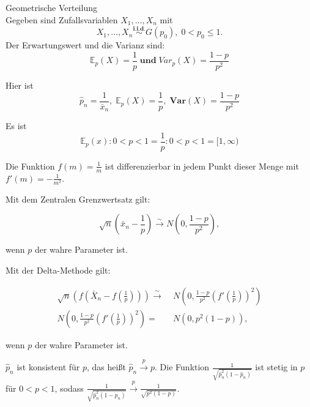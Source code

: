 \documentclass[10pt]{article}
\newcommand{\FZV}{X_1, \ldots, X_n} %
\newcommand{\EW}{\mathbb{E}} %
\newcommand{\KW}{\overset{p} \longrightarrow} %
\newcommand{\KV}{\overset{\sim} \longrightarrow} %
\newenvironment{BSP}[1][]
{\begin{Beispiel}[frametitle=#1]}{\end{Beispiel}}
\begin{document}
	\begin{BSP}[Beispiel 1..... (Delta-Methode)]		
		\noindent Geometrische Verteilung \\
		Gegeben sind Zufallsvariablen $\FZV$ mit
		\begin{equation*}
			\FZV \overset{\textbf{i.i.d.}}{\sim} G(p_0), \; 0 < p_0 \leq 1.
		\end{equation*} 
		Der Erwartungswert und die Varianz sind:
		\begin{equation*}
			\EW_p(X) = \frac{1}{p} \; \textbf{und} \; Var_p(X) = \frac{1-p}{p^2}
		\end{equation*}
		
		\noindent Hier ist
		\begin{equation*}
			\hat{p}_n = \frac{1}{\bar{x}_n}, \; \EW_p(X) = \frac{1}{p},\; \textbf{Var}(X) = \frac{1-p}{p^2} 
		\end{equation*}
		
		\noindent Es ist
		\begin{equation*}
			{\EW_p(x) : 0<p<1} = {\frac{1}{p}: 0<p<1} = [1, \infty)
		\end{equation*}
		
		\noindent Die Funktion $f(m)= \frac{1}{m}$ ist differenzierbar in jedem Punkt dieser Menge mit $f'(m)= - \frac{1}{m^2}$. 
		
		\noindent Mit dem Zentralen Grenzwertsatz gilt:
		
		\begin{equation*}
			\sqrt{n}\left(\bar{x}_n - \frac{1}{p}\right) \KV N\left(0, \frac{1-p}{p^2}\right),
		\end{equation*}
		
		\noindent wenn $p$ der wahre Parameter ist. 
		
		\noindent Mit der Delta-Methode gilt:
		
		\begin{equation*}
			\begin{split}
				\sqrt{n} \left(f\left(\bar{X}_n-f\left(\frac{1}{p}\right)\right)\right) \KV&\; N\left(0,\frac{1-p}{p^2}\left(f'\left(\frac{1}{p}\right)\right)^2\right) \\
				N\left(0,\frac{1-p}{p^2}\left(f'\left(\frac{1}{p}\right)\right)^2\right) = &\;N(0,p^2(1-p)),
			\end{split}
		\end{equation*}
		
		\noindent wenn $p$ der wahre Parameter ist.
		
		$\hat{p}_n$ ist konsistent für $p$, das heißt $\hat{p}_n \KW p$.
		Die Funktion $\frac{1}{\sqrt{\hat{p}_n^2(1-\hat{p}_n)}}$ ist stetig in $p$ für $0<p<1$, sodass  $\frac{1}{\sqrt{\hat{p}_n^2(1-\hat{p}_n)}} \KW  \frac{1}{\sqrt{p^2(1-p)}}$.
		

\end{BSP}
\end{document}
